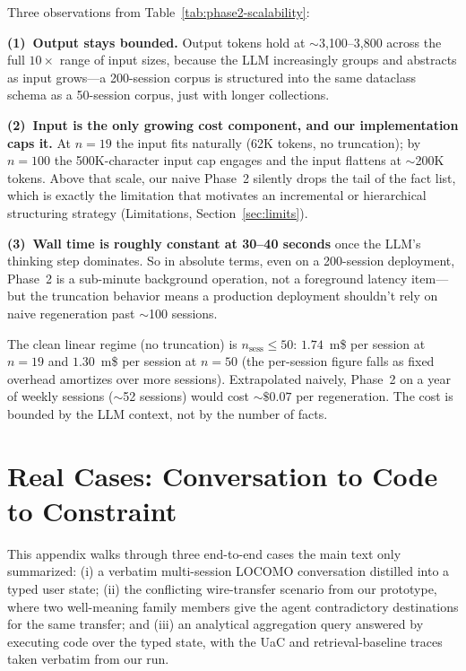 Three observations from Table~\ref{tab:phase2-scalability}:

\textbf{(1)~Output stays bounded.} Output tokens hold at $\sim$3{,}100--3{,}800 across the full $10\times$ range of input sizes, because the LLM increasingly groups and abstracts as input grows---a 200-session corpus is structured into the same dataclass schema as a 50-session corpus, just with longer collections.

\textbf{(2)~Input is the only growing cost component, and our implementation caps it.} At $n{=}19$ the input fits naturally (62K tokens, no truncation); by $n{=}100$ the 500K-character input cap engages and the input flattens at $\sim$200K tokens. Above that scale, our naive Phase~2 silently drops the tail of the fact list, which is exactly the limitation that motivates an incremental or hierarchical structuring strategy (Limitations, Section~\ref{sec:limits}).

\textbf{(3)~Wall time is roughly constant at 30--40 seconds} once the LLM's thinking step dominates. So in absolute terms, even on a 200-session deployment, Phase~2 is a sub-minute background operation, not a foreground latency item---but the truncation behavior means a production deployment shouldn't rely on naive regeneration past $\sim$100 sessions.

The clean linear regime (no truncation) is $n_{\text{sess}} \leq 50$: $1.74$~m\$ per session at $n{=}19$ and $1.30$~m\$ per session at $n{=}50$ (the per-session figure falls as fixed overhead amortizes over more sessions). Extrapolated naively, Phase~2 on a year of weekly sessions ($\sim$52 sessions) would cost $\sim$$\$0.07$ per regeneration. The cost is bounded by the LLM context, not by the number of facts.


\section{Real Cases: Conversation to Code to Constraint}
\label{app:cases}

This appendix walks through three end-to-end cases the main text only summarized: (i) a verbatim multi-session LOCOMO conversation distilled into a typed user state; (ii) the conflicting wire-transfer scenario from our prototype, where two well-meaning family members give the agent contradictory destinations for the same transfer; and (iii) an analytical aggregation query answered by executing code over the typed state, with the UaC and retrieval-baseline traces taken verbatim from our run.

